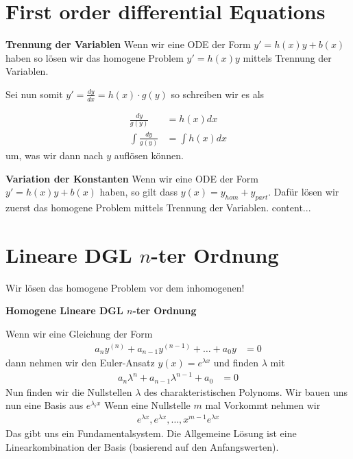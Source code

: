 \documentclass[25pt]{sciposter}
\newenvironment{method}[1]{\begin{mdframed}[backgroundcolor=blue!10,innertopmargin=15pt, innerbottommargin=15pt, nobreak=true]
		\textbf{#1 }
	}
	{ 
	\end{mdframed}
}
\newcommand{\TODO}[1]{\todo[inline]{\Large TODO:  #1}}
\begin{document}
\begin{multicols}{3}
\section*{First order differential Equations}



\begin{method}{Trennung der Variablen} Wenn wir eine ODE der Form $y' = h(x)y + b(x)$ haben so lösen wir das homogene Problem $y' = h(x)y$ mittels Trennung der Variablen.
	
Sei nun somit $y' = \frac{dy}{dx} = h(x)\cdot g(y)$ so schreiben wir es als 

\begin{align*}
	\frac{dy}{g(y)} &= h(x)dx\\
	\int \frac{dy}{g(y)} &= \int h(x)dx
\end{align*}
um, was wir dann nach $y$ auflösen können.
\end{method}


\TODO{beispiele}


\begin{method}{Variation der Konstanten} Wenn wir eine ODE der Form $y' = h(x)y + b(x)$ haben, so gilt dass $y(x) = y_{hom} + y_{part}$. Dafür lösen wir zuerst das homogene Problem mittels Trennung der Variablen.
	content...
\end{method}



\section*{Lineare DGL $n$-ter Ordnung}

Wir lösen das homogene Problem vor dem inhomogenen!

\begin{method}{Homogene Lineare DGL $n$-ter Ordnung}

Wenn wir eine Gleichung der Form
\begin{align*}
a_ny^{(n)} + a_{n-1}y^{(n-1)} + \ldots + a_0 y &= 0
\end{align*}
dann nehmen wir den Euler-Ansatz $y(x) = e^{\lambda x}$ und finden $\lambda$ mit
\begin{align*}
a_n \lambda^n + a_{n-1}\lambda^{n-1} + a_0 &= 0
\end{align*}
Nun finden wir die Nullstellen $\lambda$ des charakteristischen Polynoms. Wir bauen uns nun eine Basis aus $e^{\lambda_i x}$ Wenn eine Nullstelle $m$ mal Vorkommt nehmen wir
\begin{align*}
e^{\lambda x},e^{\lambda x}, \ldots , x^{m-1} e^{\lambda x} 
\end{align*}
Das gibt uns ein Fundamentalsystem. Die Allgemeine Lösung ist eine Linearkombination der Basis (basierend auf den Anfangswerten).
\end{method}


\end{multicols}
\end{document}
